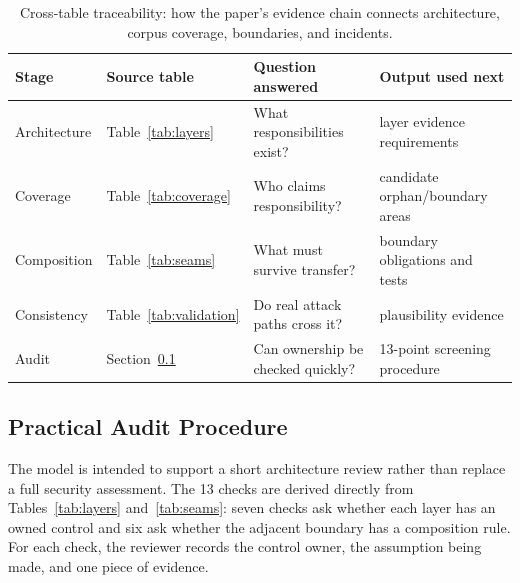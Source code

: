 \documentclass[runningheads]{llncs}
\begin{document}
\begin{table}[t]
\caption{Cross-table traceability: how the paper's evidence chain connects architecture, corpus coverage, boundaries, and incidents.}
\label{tab:trace}
\centering
\small
\begin{tabular}{@{}p{1.25cm}p{2.1cm}p{2.0cm}p{2.3cm}@{}}
\toprule
\textbf{Stage} & \textbf{Source table} & \textbf{Question answered} & \textbf{Output used next}\\
\midrule
Architecture & Table~\ref{tab:layers} & What responsibilities exist? & layer evidence requirements\\
Coverage & Table~\ref{tab:coverage} & Who claims responsibility? & candidate orphan/boundary areas\\
Composition & Table~\ref{tab:seams} & What must survive transfer? & boundary obligations and tests\\
Consistency & Table~\ref{tab:validation} & Do real attack paths cross it? & plausibility evidence\\
Audit & Section~\ref{sec:audit} & Can ownership be checked quickly? & 13-point screening procedure\\
\bottomrule
\end{tabular}
\end{table}

\subsection{Practical Audit Procedure}
\label{sec:audit}

The model is intended to support a short architecture review rather than replace a full security assessment. The 13 checks are derived directly from Tables~\ref{tab:layers} and~\ref{tab:seams}: seven checks ask whether each layer has an owned control and six ask whether the adjacent boundary has a composition rule. For each check, the reviewer records the control owner, the assumption being made, and one piece of evidence.
\end{document}
